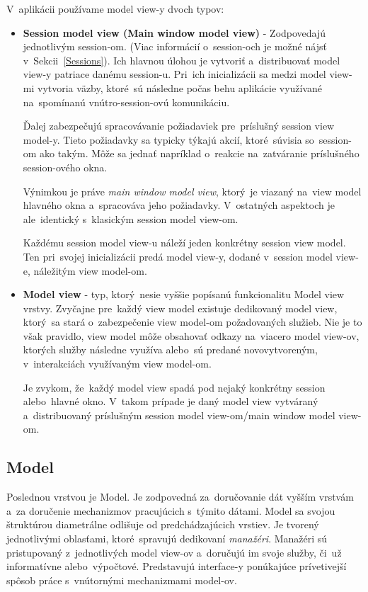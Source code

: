 V~aplikácii používame model view-y dvoch typov:
\begin{itemize}
    \item \textbf{Session model view (Main window model view)}  - Zodpovedajú jednotlivým session-om. (Viac informácií o~session-och je možné nájsť v~Sekcii~\ref{Sessions}). Ich hlavnou úlohou je vytvoriť a~distribuovať model view-y patriace danému session-u. Pri~ich inicializácii sa medzi model view-mi vytvoria väzby, ktoré~sú následne počas behu aplikácie využívané na~spomínanú vnútro-session-ovú komunikáciu. 
    
    Ďalej zabezpečujú spracovávanie požiadaviek pre~príslušný session view model-y. Tieto požiadavky sa typicky týkajú akcií, ktoré~súvisia so~session-om ako takým. Môže sa jednať napríklad o~reakcie na~zatváranie príslušného session-ového okna.  
    
    Výnimkou je práve \textit{main window model view}, ktorý~je viazaný na~view model hlavného okna a~spracováva jeho požiadavky. V~ostatných aspektoch je ale~identický s~klasickým session model view-om.
    
    Každému session model view-u náleží jeden konkrétny session view model. Ten pri~svojej inicializácii predá model view-y, dodané v~session model view-e, náležitým view model-om.   
    \item \textbf{Model view} - typ, ktorý~nesie vyššie popísanú funkcionalitu Model view vrstvy. Zvyčajne pre~každý view model existuje dedikovaný model view, ktorý~sa stará o~zabezpečenie view model-om požadovaných služieb. Nie je to však pravidlo, view model môže obsahovať odkazy na~viacero model view-ov, ktorých služby následne využíva alebo~sú predané novovytvoreným, v~interakciách využívaným view model-om.

    Je zvykom, že~každý model view spadá pod nejaký konkrétny session alebo~hlavné okno. V~takom prípade je daný model view vytváraný a~distribuovaný príslušným session model view-om/main window model view-om.  
\end{itemize}

\subsection{Model}\label{model}

Poslednou  vrstvou je Model. Je zodpovedná za~doručovanie dát vyšším vrstvám a~za doručenie mechanizmov pracujúcich s~týmito dátami. Model sa svojou štruktúrou diametrálne odlišuje od predchádzajúcich vrstiev. Je tvorený jednotlivými oblasťami, ktoré~spravujú dedikovaní \textit{manažéri}. Manažéri sú pristupovaný z~jednotlivých model view-ov a~doručujú im svoje služby, či~už informatívne alebo~výpočtové. Predstavujú interface-y ponúkajúce prívetivejší spôsob práce s~vnútornými mechanizmami model-ov. 

